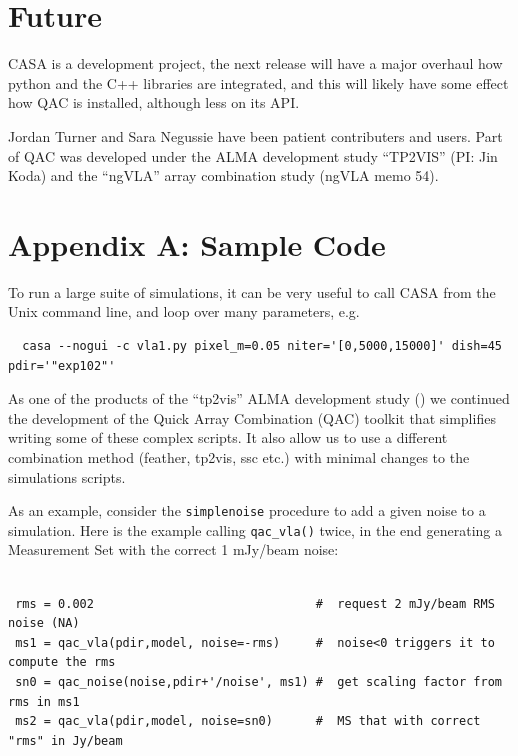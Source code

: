 \documentclass[11pt,twoside]{article}
\begin{document}
\section{Future}

CASA is a development project, the next
release will have a major overhaul how python and the C++ libraries
are integrated, and this will likely have some effect how QAC is
installed, although less on its API. 

\acknowledgements Jordan Turner and Sara Negussie have been patient contributers and users.
Part of QAC was developed under the ALMA development study ``TP2VIS''  (PI: Jin Koda) and
the ``ngVLA'' array combination study (ngVLA memo 54).



\newpage
\section*{Appendix A: Sample Code}


To run a large suite of simulations, it can be very useful to call CASA from the Unix command line,
and loop over many parameters, e.g.

\footnotesize
\begin{verbatim}
  casa --nogui -c vla1.py pixel_m=0.05 niter='[0,5000,15000]' dish=45 pdir='"exp102"' 
\end{verbatim}
\normalsize

As one of the products of the ``tp2vis'' ALMA development study (\citet{tp2vis})
we continued the development of the
Quick Array Combination (QAC) toolkit that simplifies writing some of these complex scripts. It also allow us
to use a different combination
method (feather, tp2vis, ssc etc.) with minimal changes to the simulations scripts.

As an example, consider the {\tt simplenoise} procedure to add a given noise to a simulation.
Here is the example calling {\tt qac\_vla()} twice, in the end generating a Measurement Set with
the correct 1 mJy/beam noise:

\footnotesize
\begin{verbatim}

 rms = 0.002                               #  request 2 mJy/beam RMS noise (NA)
 ms1 = qac_vla(pdir,model, noise=-rms)     #  noise<0 triggers it to compute the rms
 sn0 = qac_noise(noise,pdir+'/noise', ms1) #  get scaling factor from rms in ms1
 ms2 = qac_vla(pdir,model, noise=sn0)      #  MS that with correct "rms" in Jy/beam
\end{verbatim}
\normalsize
\end{document}
